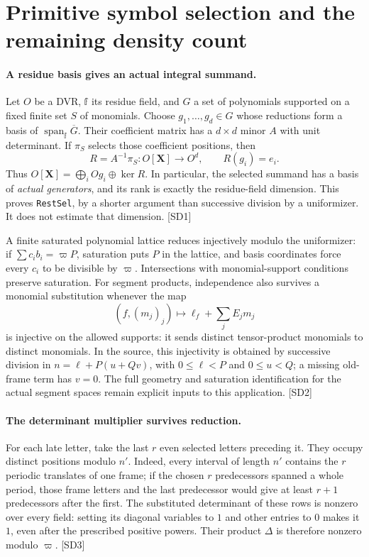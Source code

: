 \section{Primitive symbol selection and the remaining density count}\label{sec:selected-dimension}


\paragraph{A residue basis gives an actual integral summand.}
Let $O$ be a DVR, $\mathbb f$ its residue field, and $G$ a set of polynomials supported on a fixed finite set $S$ of monomials. Choose $g_1,\ldots,g_d\in G$ whose reductions form a basis of $\operatorname{span}_{\mathbb f}\overline G$. Their coefficient matrix has a $d\times d$ minor $A$ with unit determinant. If $\pi_S$ selects those coefficient positions, then
\[
 R=A^{-1}\pi_S:O[\mathbf X]\longrightarrow O^d,
 \qquad R(g_i)=e_i.
\]
Thus $O[\mathbf X]=\bigoplus_i Og_i\oplus\ker R$. In particular, the selected summand has a basis of \emph{actual generators}, and its rank is exactly the residue-field dimension. This proves \texttt{RestSel}, by a shorter argument than successive division by a uniformizer. It does not estimate that dimension. \textsf{[SD1]}

A finite saturated polynomial lattice reduces injectively modulo the uniformizer: if $\sum c_i b_i=\varpi P$, saturation puts $P$ in the lattice, and basis coordinates force every $c_i$ to be divisible by $\varpi$. Intersections with monomial-support conditions preserve saturation. For segment products, independence also survives a monomial substitution whenever the map
\[
 (f,(m_j)_j)\longmapsto \ell_f+\sum_j E_jm_j
\]
is injective on the allowed supports: it sends distinct tensor-product monomials to distinct monomials. In the source, this injectivity is obtained by successive division in
$n=\ell+P(u+Qv)$, with $0\le\ell<P$ and $0\le u<Q$; a missing old-frame term has $v=0$. The full geometry and saturation identification for the actual segment spaces remain explicit inputs to this application. \textsf{[SD2]}

\paragraph{The determinant multiplier survives reduction.}
For each late letter, take the last $r$ even selected letters preceding it. They occupy distinct positions modulo $n'$. Indeed, every interval of length $n'$ contains the $r$ periodic translates of one frame; if the chosen $r$ predecessors spanned a whole period, those frame letters and the last predecessor would give at least $r+1$ predecessors after the first. The substituted determinant of these rows is nonzero over every field: setting its diagonal variables to $1$ and other entries to $0$ makes it $1$, even after the prescribed positive powers. Their product $\Delta$ is therefore nonzero modulo $\varpi$. \textsf{[SD3]}

